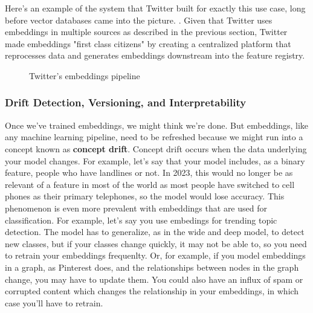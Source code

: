 \documentclass[11pt, table]{diazessay} %
\begin{document}
\begin{sloppypar}
Here's an example of the system that Twitter built for exactly this use case, long before vector databases came into the picture. \citep{shiebler2010making}. Given that Twitter uses embeddings in multiple sources as described in the previous section, Twitter made embeddings "first class citizens" by creating a centralized platform that reprocesses data and generates embeddings downstream into the feature registry. 


\begin{figure}[H]
\caption{Twitter's embeddings pipeline\citep{shiebler2010making}}
\end{figure}

\subsubsection{Drift Detection, Versioning, and Interpretability}

Once we've trained embeddings, we might think we're done. But embeddings, like any machine learning pipeline, need to be refreshed because we might run into a concept known as \textbf{concept drift}. Concept drift occurs when the data underlying your model changes. For example, let's say that your model includes, as a binary feature, people who have landlines or not. In 2023, this would no longer be as relevant of a feature in most of the world as most people have switched to cell phones as their primary telephones, so the model would lose accuracy. This phenomenon is even more prevalent with embeddings that are used for classification. For example, let's say you use embedings for trending topic detection. The model has to generalize, as in the wide and deep model, to detect new classes, but if your classes change quickly, it may not be able to, so  you need to retrain your embeddings frequenlty. Or, for example, if you model embeddings in a graph, as Pinterest does, and the relationships between nodes in the graph change, you may have to update them\citep{wewer2021updating}. You could also have an influx of spam or corrupted content which changes the relationship in your embeddings, in which case you'll have to retrain. 


\end{sloppypar}
\end{document}
